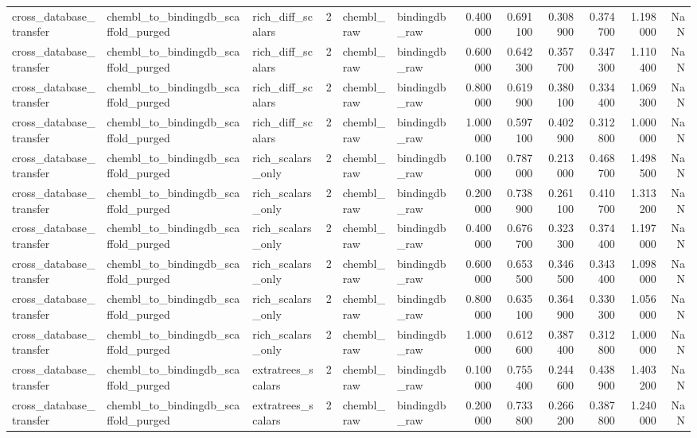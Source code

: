 \begin{longtable}{lllrllrrrrrr}
cross\_database\_transfer & chembl\_to\_bindingdb\_scaffold\_purged & rich\_diff\_scalars & 2 & chembl\_raw & bindingdb\_raw & 0.400000 & 0.691100 & 0.308900 & 0.374700 & 1.198000 & NaN \\
cross\_database\_transfer & chembl\_to\_bindingdb\_scaffold\_purged & rich\_diff\_scalars & 2 & chembl\_raw & bindingdb\_raw & 0.600000 & 0.642300 & 0.357700 & 0.347300 & 1.110400 & NaN \\
cross\_database\_transfer & chembl\_to\_bindingdb\_scaffold\_purged & rich\_diff\_scalars & 2 & chembl\_raw & bindingdb\_raw & 0.800000 & 0.619900 & 0.380100 & 0.334400 & 1.069300 & NaN \\
cross\_database\_transfer & chembl\_to\_bindingdb\_scaffold\_purged & rich\_diff\_scalars & 2 & chembl\_raw & bindingdb\_raw & 1.000000 & 0.597100 & 0.402900 & 0.312800 & 1.000000 & NaN \\
cross\_database\_transfer & chembl\_to\_bindingdb\_scaffold\_purged & rich\_scalars\_only & 2 & chembl\_raw & bindingdb\_raw & 0.100000 & 0.787000 & 0.213000 & 0.468700 & 1.498500 & NaN \\
cross\_database\_transfer & chembl\_to\_bindingdb\_scaffold\_purged & rich\_scalars\_only & 2 & chembl\_raw & bindingdb\_raw & 0.200000 & 0.738900 & 0.261100 & 0.410700 & 1.313200 & NaN \\
cross\_database\_transfer & chembl\_to\_bindingdb\_scaffold\_purged & rich\_scalars\_only & 2 & chembl\_raw & bindingdb\_raw & 0.400000 & 0.676700 & 0.323300 & 0.374400 & 1.197000 & NaN \\
cross\_database\_transfer & chembl\_to\_bindingdb\_scaffold\_purged & rich\_scalars\_only & 2 & chembl\_raw & bindingdb\_raw & 0.600000 & 0.653500 & 0.346500 & 0.343400 & 1.098000 & NaN \\
cross\_database\_transfer & chembl\_to\_bindingdb\_scaffold\_purged & rich\_scalars\_only & 2 & chembl\_raw & bindingdb\_raw & 0.800000 & 0.635100 & 0.364900 & 0.330300 & 1.056000 & NaN \\
cross\_database\_transfer & chembl\_to\_bindingdb\_scaffold\_purged & rich\_scalars\_only & 2 & chembl\_raw & bindingdb\_raw & 1.000000 & 0.612600 & 0.387400 & 0.312800 & 1.000000 & NaN \\
cross\_database\_transfer & chembl\_to\_bindingdb\_scaffold\_purged & extratrees\_scalars & 2 & chembl\_raw & bindingdb\_raw & 0.100000 & 0.755400 & 0.244600 & 0.438900 & 1.403200 & NaN \\
cross\_database\_transfer & chembl\_to\_bindingdb\_scaffold\_purged & extratrees\_scalars & 2 & chembl\_raw & bindingdb\_raw & 0.200000 & 0.733800 & 0.266200 & 0.387800 & 1.240000 & NaN \\

\end{longtable}
